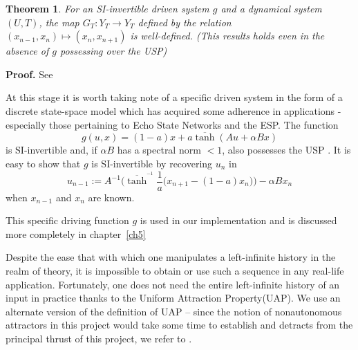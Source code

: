 \documentclass[a4paper,12pt,twoside]{report}
\newtheorem{Theorem}{Theorem}[]
\begin{document}
\begin{Theorem}\label{Thm_GT_Exists}
  For an SI-invertible driven system $g$ and a dynamical system $(U,T)$, the map $G_T: Y_T \to Y_T$ defined by the relation $(x_{n-1},x_n) \mapsto (x_n,x_{n+1})$ is well-defined. 
  (This results holds even in the absence of $g$ possessing over the USP) 
  \end{Theorem}
  {\bf Proof.} See~\cite[Th.3]{Supp}



At this stage it is worth taking note of a specific driven system in the form of a discrete state-space model which has acquired some adherence in applications \cite{Manju_IEEE}- especially those pertaining to Echo State Networks and the ESP. The function 
\begin{equation}  \label{eqn_driving}
  g(u,x) = (1-a)x + a\overline{\tanh}(Au + \alpha Bx)
\end{equation} 
is SI-invertible and, if $\alpha B$ has a spectral norm $<1$, also possesses the USP \cite[Th.2]{manjunath2013echo }. 
It is easy to show that $g$ is SI-invertible by recovering $u_n$ in 
\begin{equation} \label{eqn_SI_RNN}
  u_{n-1} := A^{-1}\bigg(\overline{\tanh}^{^{-1}}\frac{1}{a}\Big(x_{n+1}-(1-a)x_n\Big) \bigg) - \alpha B x_n
  \end{equation}
  when $x_{n-1}$ and $x_n$ are known.

This specific driving function $g$ is used in our implementation and is discussed more completely in chapter~\ref{ch5}

Despite the ease that with which one manipulates a left-infinite history in the realm of theory, it is impossible to obtain or use such a sequence in any real-life application.  
Fortunately, one does not need the entire left-infinite history of an input in practice thanks to the Uniform Attraction Property(UAP). 
We use an alternate version of the definition of UAP -- since the notion of nonautonomous attractors in this project would take some time to establish and detracts from the principal thrust of this project, we refer to \cite{Manju_Nonlinearity}. 
\end{document}
